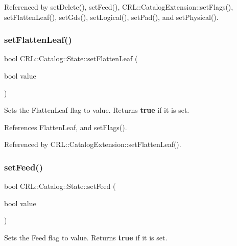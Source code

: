 Referenced by set\+Delete(), set\+Feed(), C\+R\+L\+::\+Catalog\+Extension\+::set\+Flags(), set\+Flatten\+Leaf(), set\+Gds(), set\+Logical(), set\+Pad(), and set\+Physical().

\mbox{\label{classCRL_1_1Catalog_1_1State_a4fba9a5ea27f5a36e41f0246124a3095}} 
\subsubsection{\texorpdfstring{set\+Flatten\+Leaf()}{setFlattenLeaf()}}
{\footnotesize\ttfamily bool C\+R\+L\+::\+Catalog\+::\+State\+::set\+Flatten\+Leaf (\begin{DoxyParamCaption}\item[{bool}]{value }\end{DoxyParamCaption})\hspace{0.3cm}{\ttfamily [inline]}}

Sets the Flatten\+Leaf flag to {\ttfamily value}. Returns {\bfseries true} if it is set. 

References Flatten\+Leaf, and set\+Flags().



Referenced by C\+R\+L\+::\+Catalog\+Extension\+::set\+Flatten\+Leaf().

\mbox{\label{classCRL_1_1Catalog_1_1State_ab5936e80369947177be88c3d770f4725}} 
\subsubsection{\texorpdfstring{set\+Feed()}{setFeed()}}
{\footnotesize\ttfamily bool C\+R\+L\+::\+Catalog\+::\+State\+::set\+Feed (\begin{DoxyParamCaption}\item[{bool}]{value }\end{DoxyParamCaption})\hspace{0.3cm}{\ttfamily [inline]}}

Sets the Feed flag to {\ttfamily value}. Returns {\bfseries true} if it is set. 

